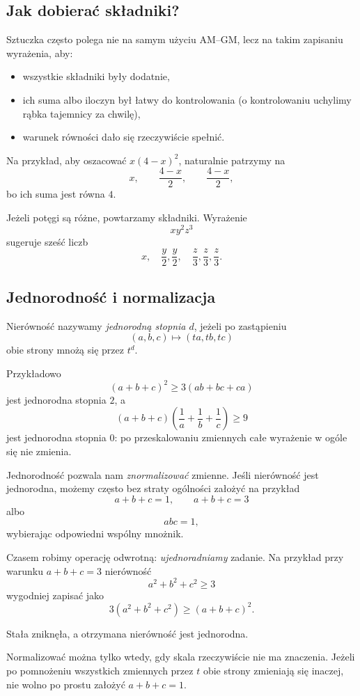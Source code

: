 \documentclass{lecture-kuznia}
\begin{document}
\subsection{Jak dobierać składniki?}

Sztuczka często polega nie na samym użyciu AM--GM,
lecz na takim zapisaniu wyrażenia, aby:

\begin{itemize}
	\item wszystkie składniki były dodatnie,
	\item ich suma albo iloczyn był łatwy do kontrolowania
	(o kontrolowaniu uchylimy rąbka tajemnicy za chwilę),
	\item warunek równości dało się rzeczywiście spełnić.
\end{itemize}

Na przykład, aby oszacować $x(4-x)^2$, naturalnie patrzymy na
\[
	x,\qquad \frac{4-x}{2},\qquad \frac{4-x}{2},
\]
bo ich suma jest równa $4$.

Jeżeli potęgi są różne, powtarzamy składniki. Wyrażenie
\[
	xy^2z^3
\]
sugeruje sześć liczb
\[
	x,\quad \frac y2,\frac y2,\quad
	\frac z3,\frac z3,\frac z3.
\]

\subsection{Jednorodność i normalizacja}

Nierówność nazywamy \emph{jednorodną stopnia $d$}, jeżeli po zastąpieniu
\[
	(a,b,c)\longmapsto(ta,tb,tc)
\]
obie strony mnożą się przez $t^d$.

Przykładowo
\[
	(a+b+c)^2\ge3(ab+bc+ca)
\]
jest jednorodna stopnia $2$, a
\[
	(a+b+c)\left(\frac1a+\frac1b+\frac1c\right)\ge9
\]
jest jednorodna stopnia $0$: po przeskalowaniu zmiennych całe wyrażenie
w ogóle się nie zmienia.

Jednorodność pozwala nam \emph{znormalizować} zmienne. Jeśli nierówność
jest jednorodna, możemy często bez straty ogólności założyć na przykład
\[
	a+b+c=1,\qquad a+b+c=3
\]
albo
\[
	abc=1,
\]
wybierając odpowiedni wspólny mnożnik.

Czasem robimy operację odwrotną: \emph{ujednoradniamy} zadanie.
Na przykład przy warunku $a+b+c=3$ nierówność
\[
	a^2+b^2+c^2\ge3
\]
wygodniej zapisać jako
\[
	3(a^2+b^2+c^2)\ge(a+b+c)^2.
\]

Stała zniknęła, a otrzymana nierówność jest jednorodna.

\begin{remark}
	Normalizować można tylko wtedy, gdy skala rzeczywiście nie ma znaczenia.
	Jeżeli po pomnożeniu wszystkich zmiennych przez $t$ obie strony zmieniają
	się inaczej, nie wolno po prostu założyć $a+b+c=1$.
\end{remark}
\end{document}
